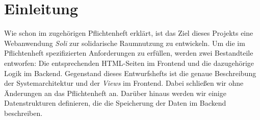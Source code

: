 
\chapter{Einleitung}
\label{ch:preface}


Wie schon im zugehörigen Pflichtenheft erklärt, ist das Ziel dieses Projekts eine Webanwendung \textit{Soli} zur solidarische Raumnutzung zu entwickeln.
Um die im Pflichtenheft spezifizierten Anforderungen zu erfüllen, werden zwei Bestandteile entworfen: Die entsprechenden HTML-Seiten im Frontend und die dazugehörige Logik im Backend.
Gegenstand dieses Entwurfshefts ist die genaue Beschreibung der Systemarchitektur und der \textit{Views} im Frontend. Dabei schließen wir ohne Änderungen an das Pflichtenheft an.
Darüber hinaus werden wir einige Datenstrukturen definieren, die die Speicherung der Daten im Backend beschreiben.